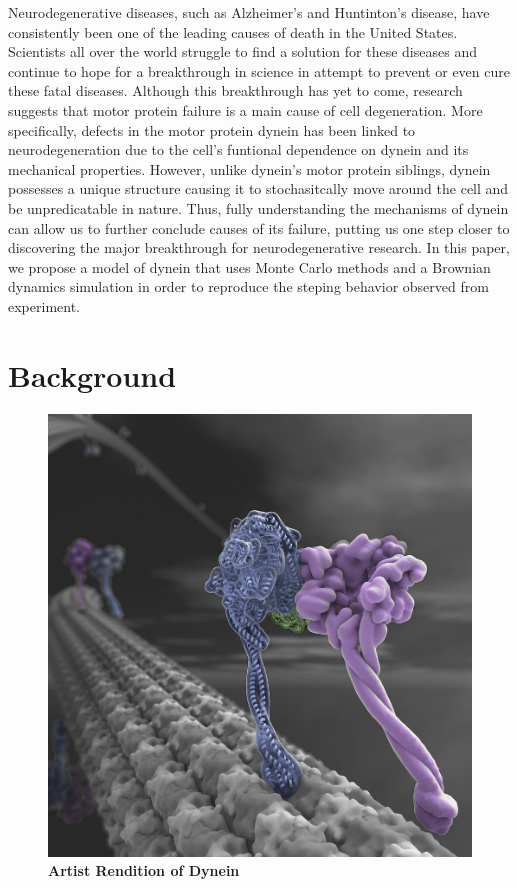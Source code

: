 
	Neurodegenerative diseases, such as Alzheimer's and Huntinton's disease, have consistently been one of the leading causes of death in the United States. Scientists all over the world struggle to find a solution for these diseases and continue to hope for a breakthrough in science in attempt to prevent or even cure these fatal diseases. Although this breakthrough has yet to come, research suggests that motor protein failure is a main cause of cell degeneration. More specifically, defects in the motor protein dynein has been linked to neurodegeneration due to the cell's funtional dependence on dynein and its mechanical properties. However, unlike dynein's motor protein siblings, dynein possesses a unique structure causing it to stochasitcally move around the cell and be unpredicatable in nature. Thus, fully understanding the mechanisms of dynein can allow us to further conclude causes of its failure, putting us one step closer to discovering the major breakthrough for neurodegenerative research. In this paper, we propose a model of dynein that uses Monte Carlo methods and a Brownian dynamics simulation in order to reproduce the steping behavior observed from experiment. 

\section{Background}

\begin{figure}[H]
	\centering
	\includegraphics[width=0.5\columnwidth]{Figures/dynein_walking_art.jpg}
	\caption[Artist Rendition of Dynein]{\textbf{Artist Rendition of Dynein} \cite{JohnsonArt}}
	\label{fig:ArtDynein}
\end{figure}

